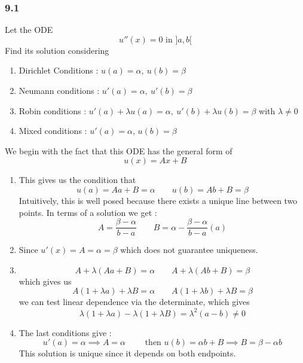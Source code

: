 \subsubsection{9.1}
Let the ODE 
\[
    u''(x) = 0 \text{ in } ]a,b[
\]
Find its solution considering 
\begin{enumerate}[label={(\alph*)}]
    \item Dirichlet Conditions : $ u(a) = \alpha, \ u(b) = \beta $
    \item Neumann conditions : $ u'(a) = \alpha , \ u'(b) = \beta  $
    \item Robin conditions : $ u'(a) + \lambda u(a) = \alpha, \ u'(b) + \lambda u(b) =
        \beta  $ with $ \lambda \neq 0 $
    \item Mixed conditions : $ u'(a) = \alpha $, $ u(b) = \beta $
\end{enumerate}
We begin with the fact that this ODE has the general form of 
\[
    u(x) = Ax + B
\]
\begin{enumerate}[label={(\alph*)}]
    \item This gives us the condition that 
        \[
            u(a) = Aa + B = \alpha \qquad u(b) = Ab + B = \beta 
        \]
        Intuitively, this is well posed because there exists a unique line between two
        points. In terms of a solution we get : 
        \[
            A = \frac{ \beta - \alpha  }{ b - a } \qquad B = \alpha - \frac{ \beta -\alpha
            }{ b-a } (a) 
        \]
    \item Since $ u'(x) = A = \alpha = \beta $ which does not guarantee uniqueness. 
    \item 
        \[
            A + \lambda \left(Aa + B  \right) = \alpha \qquad A + \lambda \left( Ab + B\right)  = \beta 
        \] which gives us 
        \[
            A\left( 1 + \lambda a\right) + \lambda B = \alpha \qquad A\left( 1 + \lambda
            b\right) + \lambda B = \beta 
        \]
        we can test linear dependence via the determinate, which gives 
        \[
        \lambda\left( 1 + \lambda a\right) - \lambda\left( 1 + \lambda B\right) =
        \lambda^2\left( a-b\right) \neq 0
        \]
    \item The last conditions give : 
        \[
        u'(a) = \alpha \implies A = \alpha \qquad \text{ then } u(b) = \alpha b + B
        \implies B = \beta - \alpha b
        \] 
        This solution is unique since it depends on both endpoints. 
\end{enumerate}



